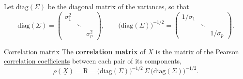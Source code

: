 \documentclass[a4paper,12pt,oneside]{report}
\begin{document}
Let $\mathrm{diag}(\Sigma)$ be the diagonal matrix of the variances, so that
\[
\mathrm{diag}(\Sigma)=
\begin{pmatrix}
\sigma_1^2&&\\
&\ddots&\\
&&\sigma_p^2
\end{pmatrix},
\qquad
\big(\mathrm{diag}(\Sigma)\big)^{-1/2}=
\begin{pmatrix}
1/\sigma_1&&\\
&\ddots&\\
&&1/\sigma_p
\end{pmatrix}.
\]

\begin{frameddefn}{Correlation matrix}\label{def:correlation-matrix}
The \textbf{correlation matrix} of $\underline{X}$ is the matrix of the
\hyperref[def:correlation]{Pearson correlation coefficients} between each
pair of its components,
\[
\rho(\underline{X})=\mathrm{R}
=\big(\mathrm{diag}(\Sigma)\big)^{-1/2}\,\Sigma\,\big(\mathrm{diag}(\Sigma)\big)^{-1/2}.
\]
\end{frameddefn}
\end{document}
